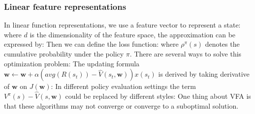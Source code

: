 \documentclass[12pt]{report}
\begin{document}
\subsubsection{Linear feature representations}
In linear function representations, we use a feature vector to represent a state:
where $d$ is the dimensionality of the feature space, the approximation can be expressed by:
Then we can define the loss function:
where $\rho^\pi(s)$ denotes the cumulative probability under the policy $\pi$. There are several ways to solve this optimization problem:
The updating formula $\mathbf{w}\leftarrow\mathbf{w}+\alpha(avg (R(s_t))-\hat{V}(s_t,\mathbf{w}))x(s_t)$ is derived by taking derivative
of $\mathbf{w}$ on $J(\mathbf{w})$:
In different policy evaluation settings the term $V^{\pi}(s)-\hat{V}(s,\mathbf{w})$ could be replaced by different styles:
One thing about VFA is that these algorithms may not converge or converge to a suboptimal solution.
\end{document}
